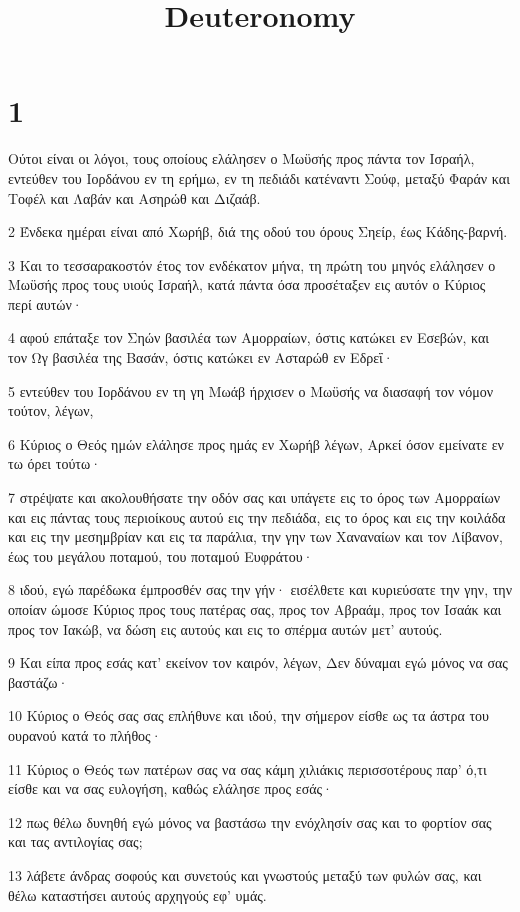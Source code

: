 

\title{Deuteronomy}


\chapter{1}

\par Ούτοι είναι οι λόγοι, τους οποίους ελάλησεν ο Μωϋσής προς πάντα τον Ισραήλ, εντεύθεν του Ιορδάνου εν τη ερήμω, εν τη πεδιάδι κατέναντι Σούφ, μεταξύ Φαράν και Τοφέλ και Λαβάν και Ασηρώθ και Διζαάβ.
\par 2 Ένδεκα ημέραι είναι από Χωρήβ, διά της οδού του όρους Σηείρ, έως Κάδης-βαρνή.
\par 3 Και το τεσσαρακοστόν έτος τον ενδέκατον μήνα, τη πρώτη του μηνός ελάλησεν ο Μωϋσής προς τους υιούς Ισραήλ, κατά πάντα όσα προσέταξεν εις αυτόν ο Κύριος περί αυτών·
\par 4 αφού επάταξε τον Σηών βασιλέα των Αμορραίων, όστις κατώκει εν Εσεβών, και τον Ωγ βασιλέα της Βασάν, όστις κατώκει εν Ασταρώθ εν Εδρεΐ·
\par 5 εντεύθεν του Ιορδάνου εν τη γη Μωάβ ήρχισεν ο Μωϋσής να διασαφή τον νόμον τούτον, λέγων,
\par 6 Κύριος ο Θεός ημών ελάλησε προς ημάς εν Χωρήβ λέγων, Αρκεί όσον εμείνατε εν τω όρει τούτω·
\par 7 στρέψατε και ακολουθήσατε την οδόν σας και υπάγετε εις το όρος των Αμορραίων και εις πάντας τους περιοίκους αυτού εις την πεδιάδα, εις το όρος και εις την κοιλάδα και εις την μεσημβρίαν και εις τα παράλια, την γην των Χαναναίων και τον Λίβανον, έως του μεγάλου ποταμού, του ποταμού Ευφράτου·
\par 8 ιδού, εγώ παρέδωκα έμπροσθέν σας την γήν· εισέλθετε και κυριεύσατε την γην, την οποίαν ώμοσε Κύριος προς τους πατέρας σας, προς τον Αβραάμ, προς τον Ισαάκ και προς τον Ιακώβ, να δώση εις αυτούς και εις το σπέρμα αυτών μετ' αυτούς.
\par 9 Και είπα προς εσάς κατ' εκείνον τον καιρόν, λέγων, Δεν δύναμαι εγώ μόνος να σας βαστάζω·
\par 10 Κύριος ο Θεός σας σας επλήθυνε και ιδού, την σήμερον είσθε ως τα άστρα του ουρανού κατά το πλήθος·
\par 11 Κύριος ο Θεός των πατέρων σας να σας κάμη χιλιάκις περισσοτέρους παρ' ό,τι είσθε και να σας ευλογήση, καθώς ελάλησε προς εσάς·
\par 12 πως θέλω δυνηθή εγώ μόνος να βαστάσω την ενόχλησίν σας και το φορτίον σας και τας αντιλογίας σας;
\par 13 λάβετε άνδρας σοφούς και συνετούς και γνωστούς μεταξύ των φυλών σας, και θέλω καταστήσει αυτούς αρχηγούς εφ' υμάς.
